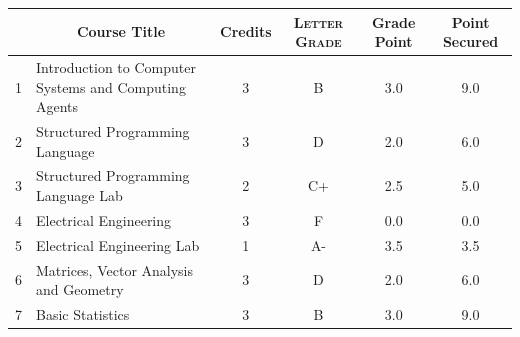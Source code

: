 \documentclass[11pt]{article}
\newcommand*{\numtwo}[1]{\pgfmathprintnumber[
                    fixed, precision=2, fixed zerofill=true]{#1}}
\begin{document}
                \begin{center}
                    \renewcommand{\arraystretch}{1.08}
                    
                \begin{tabular}{|c|l|c|>{\scshape}c|c|c|}
                \hline  \rule[-1ex]{0pt}{3.5ex} {\centering{\bf Course Code}} &  \multicolumn{1}{c|}{\textbf{Course Title}}  & {\bf Credits} & {\bf Letter Grade} & {\bf Grade Point} & {\bf Point Secured}  \\ 
                \hline   1 &  Introduction to Computer Systems and Computing Agents		 & 3 & B & 3.0 & 9.0 \\ %
                \hline   2 &  Structured Programming Language		 & 3 & D & 2.0 & 6.0 \\ %
                \hline   3 &  Structured Programming Language Lab		 & 2 & C+ & 2.5 & 5.0 \\ %
                \hline   4 &  Electrical Engineering		 & 3 & F & 0.0 & 0.0 \\ %
                \hline   5 &  Electrical Engineering Lab		 & 1 & A- & 3.5 & 3.5 \\ %
                \hline   6 &  Matrices, Vector Analysis and Geometry		 & 3 & D & 2.0 & 6.0 \\ %
                \hline   7 &  Basic Statistics		 & 3 & B & 3.0 & 9.0 \\ %

\hline                %
                \end{tabular}
                \end{center}
                \renewcommand{\arraystretch}{1.03}
\end{document}
